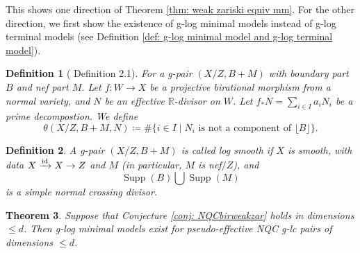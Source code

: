 \documentclass[11pt]{amsart}
\newcommand{\Rr}{\mathbb{R}}
\newcommand{\Supp}{\operatorname{Supp}}
\newcommand{\lf}{\lfloor}
\newcommand{\rf}{\rfloor}
\newtheorem{theorem}{Theorem}[section]
\newtheorem{definition}[theorem]{Definition}
\begin{document}
This shows one direction of Theorem \ref{thm: weak zariski equiv mm}. For the other direction, we first show the existence of g-log minimal models instead of g-log terminal models (see Definition \ref{def: g-log minimal model and g-log terminal model}).

\begin{definition}[\cite{Birkarweak12} Definition 2.1]\label{def: theta}
	For a g-pair $(X/Z, B+M)$ with boundary part $B$ and nef part $M$. Let $f:W\to X$ be a projective birational morphism from a normal variety, and $N$ be an effective $\Rr$-divisor on $W$. Let $f_{*}N=\sum_{i\in I} a_i N_i$ be a prime decompostion. We define
	\[
	\theta(X/Z,B+M,N) \coloneqq \#\{i\in I \mid N_i \text{~is not a component of~} \lf B\rf\}.
	\]
\end{definition}

\begin{definition}
A g-pair $(X/Z, B+M)$ is called \emph{log smooth} if $X$ is smooth, with data $X \xrightarrow{{\rm id}} X \to Z$ and $M$ (in particular, $M$ is nef$/Z$), and 
\[
\Supp(B)\bigcup\Supp(M)
\] is a simple normal crossing divisor. 
\end{definition}

\begin{theorem}\label{thm: weak zariski implies mm}
	Suppose that Conjecture \ref{conj: NQCbirweakzar} holds in dimensions $\le d$. Then g-log minimal models exist for pseudo-effective NQC g-lc pairs of dimensions $\le d$.
\end{theorem}
\end{document}
